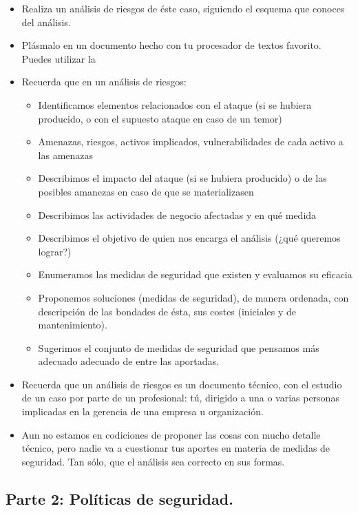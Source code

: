 \begin{itemize}
\item Realiza un análisis de riesgos de éste caso, siguiendo el esquema que conoces del análisis.
\item Plásmalo en un documento hecho con tu procesador de textos favorito. Puedes utilizar la 
\item Recuerda que en un análisis de riesgos:
  \begin{itemize}
  \item Identificamos elementos relacionados con el ataque (si se hubiera producido, o con el supuesto ataque en    caso de un temor)
  \item Amenazas, riesgos, activos implicados, vulnerabilidades de cada activo a las amenazas
  \item Describimos el impacto del ataque (si se hubiera producido) o de las posibles amanezas en caso de que se materializasen
  \item Describimos las actividades de negocio afectadas y en qué medida
  \item Describimos el objetivo de quien nos encarga el análisis (¿qué queremos lograr?)
  \item Enumeramos las medidas de seguridad que existen y evaluamos su eficacia
  \item Proponemos soluciones (medidas de seguridad), de manera ordenada, con descripción de las bondades de ésta, sus costes (iniciales y de mantenimiento).
  \item Sugerimos el conjunto de medidas de seguridad que pensamos más adecuado adecuado de entre las aportadas.
  \end{itemize}
\item Recuerda que un análisis de riesgos es un documento técnico, con el estudio de un caso por parte de un profesional: tú, dirigido a una o varias personas implicadas en la gerencia de una empresa u organización.
\item Aun no estamos en codiciones de proponer las cosas con mucho detalle técnico, pero nadie va a cuestionar tus aportes en materia de medidas de seguridad. Tan sólo, que el análisis sea correcto en sus formas.
\end{itemize}

\subsection{Parte 2: Políticas de seguridad.}



